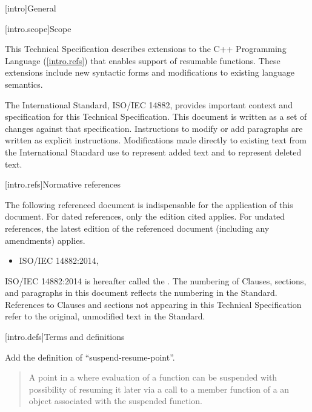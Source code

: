 
[intro]{General}

[intro.scope]{Scope}

\pnum
This Technical Specification describes extensions to the C++ 
Programming Language (\ref{intro.refs}) that
enables support of resumable functions. These extensions include 
new syntactic forms and modifications to existing language semantics.

\pnum
The International Standard, ISO/IEC 14882, provides important context
and specification for this Technical Specification. This document is 
written as a set of changes against that specification. Instructions
to modify or add paragraphs are written as explicit instructions. 
Modifications made directly to existing text from the International
Standard use  to represent added text and
 to represent deleted text.



[intro.refs]{Normative references}

\pnum
The following referenced document is indispensable for the
application of this document. For dated references, only the
edition cited applies. For undated references, the latest edition
of the referenced document (including any amendments) applies.

\begin{itemize}
\item ISO/IEC 14882:2014, 
\end{itemize}

ISO/IEC 14882:2014 is hereafter called the .
%
The numbering of Clauses, sections, and paragraphs in this document
reflects the numbering in the \Cpp Standard. References to Clauses
and sections not appearing in this Technical Specification refer to
the original, unmodified text in the \Cpp Standard.

[intro.defs]{Terms and definitions}

Add the definition of ``suspend-resume-point''.

\setcounter{subsection}{26}
\begin{quote}
%
A point in a 
where evaluation of a function can be suspended
with possibility of resuming it later
via a call to a member function of a
an  object associated with the suspended function.
\end{quote}

